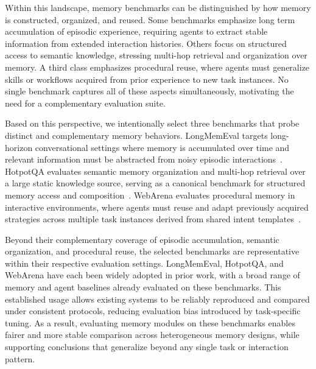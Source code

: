 Within this landscape, memory benchmarks can be distinguished by how memory is constructed, organized, and reused. Some benchmarks emphasize long term accumulation of episodic experience, requiring agents to extract stable information from extended interaction histories. Others focus on structured access to semantic knowledge, stressing multi-hop retrieval and organization over memory. A third class emphasizes procedural reuse, where agents must generalize skills or workflows acquired from prior experience to new task instances. No single benchmark captures all of these aspects simultaneously, motivating the need for a complementary evaluation suite.

Based on this perspective, we intentionally select three benchmarks that probe distinct and complementary memory behaviors. LongMemEval targets long-horizon conversational settings where memory is accumulated over time and relevant information must be abstracted from noisy episodic interactions~\citep{wu2024longmemeval}. HotpotQA evaluates semantic memory organization and multi-hop retrieval over a large static knowledge source, serving as a canonical benchmark for structured memory access and composition~\citep{yang2018hotpotqadatasetdiverseexplainable}. WebArena evaluates procedural memory in interactive environments, where agents must reuse and adapt previously acquired strategies across multiple task instances derived from shared intent templates~\citep{zhou2024webarenarealisticwebenvironment}.

Beyond their complementary coverage of episodic accumulation, semantic organization, and procedural reuse, the selected benchmarks are representative within their respective evaluation settings. LongMemEval, HotpotQA, and WebArena have each been widely adopted in prior work, with a broad range of memory and agent baselines already evaluated on these benchmarks. This established usage allows existing systems to be reliably reproduced and compared under consistent protocols, reducing evaluation bias introduced by task-specific tuning. As a result, evaluating memory modules on these benchmarks enables fairer and more stable comparison across heterogeneous memory designs, while supporting conclusions that generalize beyond any single task or interaction pattern.
